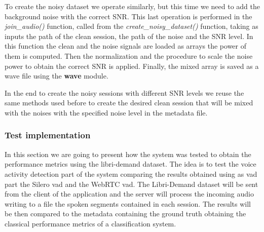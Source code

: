 \documentclass[../main.tex]{subfiles}
\begin{document}
To create the noisy dataset we operate similarly, but this time we need to add the background noise with the correct SNR. This last operation is performed in the \textit{join\_audio()} function, called from the \textit{create\_noisy\_dataset()} function, taking as inputs the path of the clean session, the path of the noise and the SNR level. In this function the clean and the noise signals are loaded as arrays the power of them is computed. Then the normalization and the procedure to scale the noise power to obtain the correct SNR is applied. Finally, the mixed array is saved as a wave file using the \textbf{wave} module.

In the end to create the noisy sessions with different SNR levels we reuse the same methods used before to create the desired clean session that will be mixed with the noises with the specified noise level in the metadata file.

\subsubsection{Test implementation}

In this section we are going to present how the system was tested to obtain the performance metrics using the libri-demand dataset. The idea is to test the voice activity detection part of the system comparing the results obtained using as vad part the Silero vad and the WebRTC vad. The Libri-Demand dataset will be sent from the client of the application and the server will process the incoming audio writing to a file the spoken segments contained in each session. The results will be then compared to the metadata containing the ground truth obtaining the classical performance metrics of a classification system.
\end{document}
